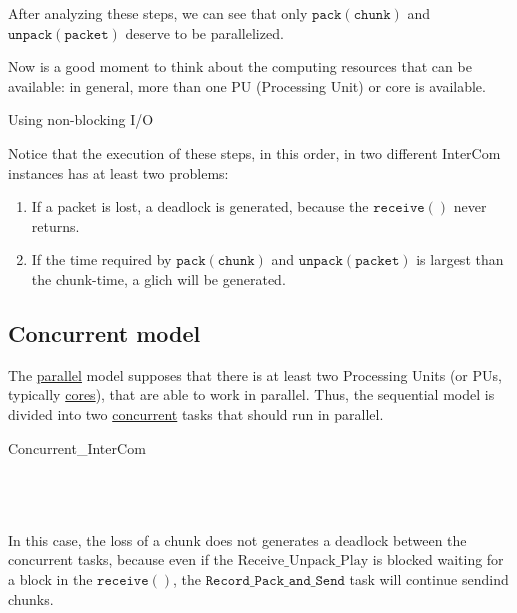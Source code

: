 After analyzing these steps, we can see that only $\mathtt{pack(chunk)}$ and $\mathtt{unpack(packet)}$ deserve to be parallelized.

Now is a good moment to think about the computing resources that can
be available: in general, more than one PU (Processing Unit) or core is available.

Using non-blocking I/O 
  
Notice that the execution of these steps, in this order, in two
different InterCom instances has at least two problems:
\begin{enumerate}
\item If a packet is lost, a deadlock is generated, because the
  $\mathtt{receive()}$ never returns.
\item If the time required by $\mathtt{pack(chunk)}$ and
  $\mathtt{unpack(packet)}$ is largest than the chunk-time, a glich
  will be generated.
\end{enumerate}

\subsection{Concurrent model}

The \href{https://en.wikipedia.org/wiki/Parallel_computing}{parallel}
model supposes that there is at least two Processing Units (or PUs,
typically
\href{https://en.wikipedia.org/wiki/Multi-core_processor}{cores}),
that are able to work in parallel. Thus, the sequential model is
divided into two
\href{https://en.wikipedia.org/wiki/Concurrency_(computer_science)}{concurrent}
tasks that should run in parallel.

\begin{pseudocode}{Concurrent\_InterCom}{~}
  \BEGIN
     \GETS {}\\
     \GETS {}\\
  \END
  \ENDPROCEDURE
  \BEGIN
     \GETS {}\\
     \GETS {}\\
  \END
  \ENDPROCEDURE
\end{pseudocode}

In this case, the loss of a chunk does not generates a deadlock
between the concurrent tasks, because even if the
$\mathrm{Receive\_Unpack\_Play}$ is blocked waiting for a block in the
$\mathtt{receive()}$, the $\mathtt{Record\_Pack\_and\_Send}$ task will
continue sendind chunks.

